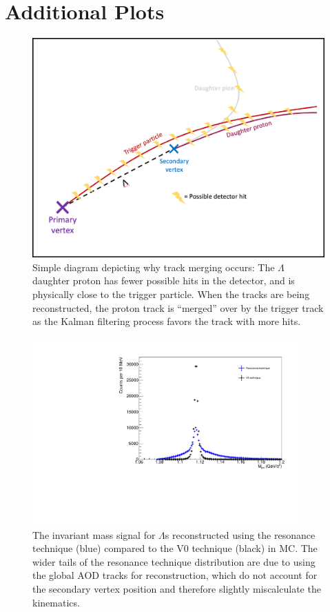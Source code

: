 \documentclass[ALICE,manyauthors]{ALICE_analysis_notes}
\begin{document}
\clearpage

\section {Additional Plots}

\begin{figure}[ht]
\centering
\includegraphics[width=5in]{figures/track_merging_diagram_withborder.pdf}
\caption{Simple diagram depicting why track merging occurs: The $\Lambda$ daughter proton has fewer possible hits in the detector, and is physically close to the trigger particle. When the tracks are being reconstructed, the proton track is ``merged'' over by the trigger track as the Kalman filtering process favors the track with more hits.}
\label{trackmerge_diagram}
\end{figure}

\begin{figure}[ht]
\centering
\includegraphics[width=4in]{figures/lambda_mass_resonance_mc.pdf}
\caption{The invariant mass signal for $\Lambda$s reconstructed using the resonance technique (blue) compared to the V0 technique (black) in MC. The wider tails of the resonance technique distribution are due to using the global AOD tracks for reconstruction, which do not account for the secondary vertex position and therefore slightly miscalculate the kinematics.}
\label{lambda_mass_v0_res_comp}
\end{figure}
\end{document}
